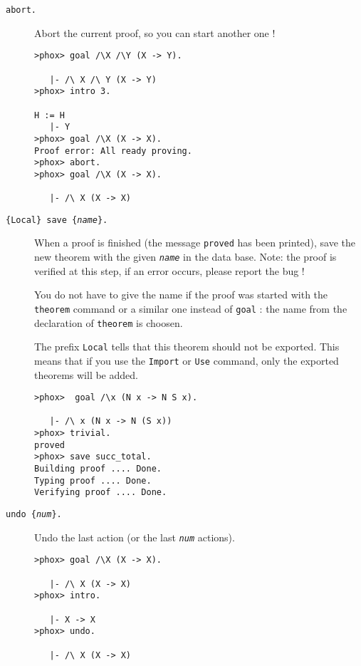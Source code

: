 \begin{description}

\item[{\tt abort.}]

  Abort the current proof, so you can start another one !

\begin{verbatim}
>phox> goal /\X /\Y (X -> Y).

   |- /\ X /\ Y (X -> Y)
>phox> intro 3.

H := H
   |- Y
>phox> goal /\X (X -> X).
Proof error: All ready proving.
>phox> abort.
>phox> goal /\X (X -> X).

   |- /\ X (X -> X)
\end{verbatim}

\item[{\tt \{Local\} save \{{\em name}\}.}]

  When a proof is finished (the message {\tt proved} has been
  printed), save the new theorem with the given {\tt\em name} in the
  data base. Note: the proof is verified at this step, if an error
  occurs, please report the bug !
  
  You do not have to give the name if the proof was started with the
  {\tt theorem} command or a similar one instead of {\tt goal} : the
  name from the declaration of {\tt theorem} is choosen.

  The prefix {\tt Local} tells that this theorem should not be exported. This
  means that if you use the {\tt Import} or {\tt Use} command, only the
  exported theorems will be added.
  
\begin{verbatim}
>phox>  goal /\x (N x -> N S x).

   |- /\ x (N x -> N (S x))
>phox> trivial.
proved
>phox> save succ_total.
Building proof .... Done.
Typing proof .... Done.
Verifying proof .... Done.
\end{verbatim}


\item[{\tt undo \{{\em num}\}.}]

  Undo the last action (or the last {\tt\em num} actions).

\begin{verbatim}
>phox> goal /\X (X -> X).

   |- /\ X (X -> X)
>phox> intro.

   |- X -> X
>phox> undo.

   |- /\ X (X -> X)
\end{verbatim}

\end{description}

